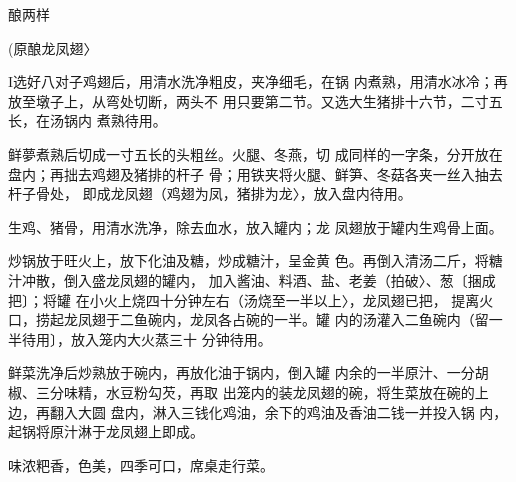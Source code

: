 \begin{recipe}{酿两样}

(原酿龙凤翅〉

\ingredients


\cooking

I选好八对子鸡翅后，用清水洗净粗皮，夹净细毛，在锅 内煮熟，用清水冰冷；再放至墩子上，从弯处切断，两头不 用只要第二节。又选大生猪排十六节，二寸五长，在汤锅内 煮熟待用。

\step 	鲜夢煮熟后切成一寸五长的头粗丝。火腿、冬燕，切 成同样的一字条，分开放在盘内；再拙去鸡翅及猪排的杆子 骨；用铁夹将火腿、鲜笋、冬菇各夹一丝入抽去杆子骨处， 即成龙凤翅（鸡翅为凤，猪排为龙〉，放入盘内待用。

\step 	生鸡、猪骨，用清水洗净，除去血水，放入罐内；龙 凤翅放于罐内生鸡骨上面。

\step 	炒锅放于旺火上，放下化油及糖，炒成糖汁，呈金黄 色。再倒入清汤二斤，将糖汁冲散，倒入盛龙凤翅的罐内， 加入酱油、料酒、盐、老姜（拍破〉、葱〔捆成把〕；将罐 在小火上烧四十分钟左右（汤烧至一半以上〉，龙凤翅已把， 提离火口，捞起龙凤翅于二鱼碗内，龙凤各占碗的一半。罐 内的汤灌入二鱼碗内（留一半待用〕，放入笼内大火蒸三十 分钟待用。

\step 	鲜菜洗净后炒熟放于碗内，再放化油于锅内，倒入罐 内余的一半原汁、一分胡椒、三分味精，水豆粉勾芡，再取 出笼内的装龙凤翅的碗，将生菜放在碗的上边，再翻入大圆 盘内，淋入三钱化鸡油，余下的鸡油及香油二钱一并投入锅 内，起锅将原汁淋于龙凤翅上即成。

\notes

味浓粑香，色美，四季可口，席桌走行菜。

\end{recipe}

